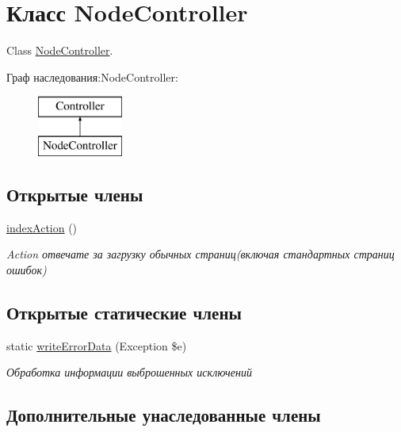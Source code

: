 \hypertarget{class_node_controller}{\section{Класс Node\-Controller}
\label{class_node_controller}
}


Class \hyperlink{class_node_controller}{Node\-Controller}.  


Граф наследования\-:Node\-Controller\-:\begin{figure}[H]
\begin{center}
\leavevmode
\includegraphics[height=2.000000cm]{class_node_controller}
\end{center}
\end{figure}
\subsection*{Открытые члены}
\begin{DoxyCompactItemize}
\item 
\hyperlink{class_node_controller_a04f2101fe1cdc785b61219c2df753024}{index\-Action} ()
\begin{DoxyCompactList}\small\item\em Action отвечате за загрузку обычных страниц(включая стандартных страниц ошибок) \end{DoxyCompactList}\end{DoxyCompactItemize}
\subsection*{Открытые статические члены}
\begin{DoxyCompactItemize}
\item 
static \hyperlink{class_node_controller_a2d13f67877bc056bc6798b3d0931c4a2}{write\-Error\-Data} (Exception \$e)
\begin{DoxyCompactList}\small\item\em Обработка информации выброшенных исключений \end{DoxyCompactList}\end{DoxyCompactItemize}
\subsection*{Дополнительные унаследованные члены}


